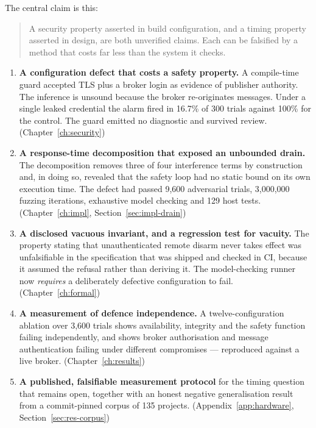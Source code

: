 The central claim is this:

\begin{quote}
A security property asserted in build configuration, and a timing property asserted in design,
are both unverified claims. Each can be falsified by a method that costs far less than the
system it checks.
\end{quote}

\begin{enumerate}[leftmargin=2.2em,itemsep=5pt,label=\textbf{C\arabic*.}]
  \item \textbf{A configuration defect that costs a safety property.} A compile-time guard
        accepted TLS plus a broker login as evidence of publisher authority. The inference is
        unsound because the broker re-originates messages. Under a single leaked credential the
        alarm fired in 16.7\% of 300 trials against 100\% for the control. The guard emitted no
        diagnostic and survived review. (Chapter~\ref{ch:security})
  \item \textbf{A response-time decomposition that exposed an unbounded drain.} The
        decomposition removes three of four interference terms by construction and, in doing
        so, revealed that the safety loop had no static bound on its own execution time. The
        defect had passed 9,600 adversarial trials, 3,000,000 fuzzing iterations, exhaustive
        model checking and 129 host tests. (Chapter~\ref{ch:impl}, Section~\ref{sec:impl-drain})
  \item \textbf{A disclosed vacuous invariant, and a regression test for vacuity.} The property
        stating that unauthenticated remote disarm never takes effect was unfalsifiable in the
        specification that was shipped and checked in CI, because it assumed the refusal rather
        than deriving it. The model-checking runner now \emph{requires} a deliberately
        defective configuration to fail. (Chapter~\ref{ch:formal})
  \item \textbf{A measurement of defence independence.} A twelve-configuration ablation over
        3,600 trials shows availability, integrity and the safety function failing
        independently, and shows broker authorisation and message authentication failing under
        different compromises — reproduced against a live broker.
        (Chapter~\ref{ch:results})
  \item \textbf{A published, falsifiable measurement protocol} for the timing question that
        remains open, together with an honest negative generalisation result from a
        commit-pinned corpus of 135 projects. (Appendix~\ref{app:hardware},
        Section~\ref{sec:res-corpus})
\end{enumerate}

